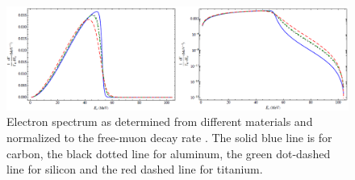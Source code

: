\documentclass[12pt,a4paper,openright, oneside, titlepage]{book} %
\begin{document}
\begin{figure}[h!]
\centering
\includegraphics[scale=0.8]{DIO_materials}
\caption{Electron spectrum as determined from different materials
and normalized to the free-muon decay rate \cite{signorelli}. 
The solid blue line is for carbon, the black dotted line for aluminum, 
the green dot-dashed line for silicon and the red dashed line for titanium.}
\label{_DIO}
\end{figure}
\end{document}
